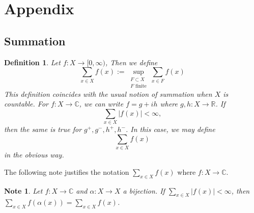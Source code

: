\documentclass[12pt]{amsart}
\newtheorem{defn}[thm]{Definition}
\newtheorem{note}[thm]{Note}
\newcommand{\al}{\alpha}
\newcommand{\C}{\mathbb{C}}
\newcommand{\R}{\mathbb{R}}
\newcommand{\Rg}{[0,\infty)}
\begin{document}
\newpage

\section{Appendix}

\subsection{Summation}

\begin{defn}
Let $f:X \rightarrow \Rg$, Then we define $$\sum_{x \in X} f(x) := \sup_{\substack{F \subset X \\ F \text{ finite}}} \sum_{x \in F} f(x)$$ This definition coincides with the usual notion of summation when $X$ is countable. For $f:X \rightarrow \C$, we can write $f = g +ih$ where $g,h:X \rightarrow \R$. If $$\sum_{x \in X}|f(x)| < \infty,$$ then the same is true for $g^+,g^-,h^+,h^-$. In this case, we may define $$\sum_{x \in X} f(x)$$ in the obvious way.
\end{defn} 

The following note justifies the notation $\sum_{x \in X}f(x)$ where $f:X \rightarrow \C$.

\begin{note}
Let $f:X \rightarrow \C$ and $\al:X \rightarrow X$ a bijection. If $\sum_{x \in X}|f(x)|< \infty$, then $\sum_{x \in X}f( \al (x)) = \sum_{x \in X}f(x) $.
\end{note}
\end{document}

